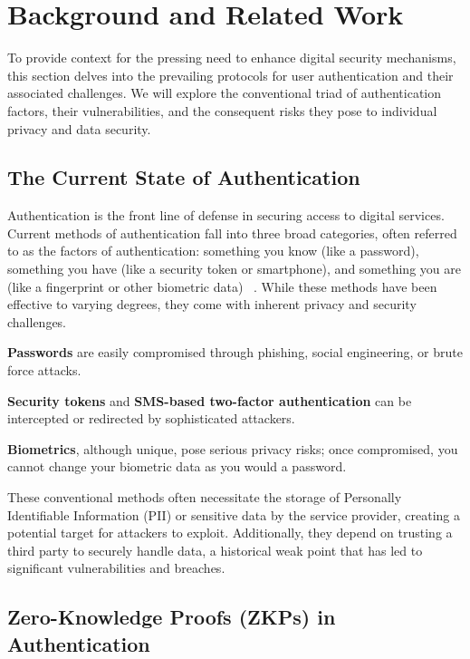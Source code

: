 \section{Background and Related Work}
\label{sec:relwork}

To provide context for the pressing need to enhance digital security mechanisms, this section delves into the prevailing protocols for user authentication and their associated challenges. We will explore the conventional triad of authentication factors, their vulnerabilities, and the consequent risks they pose to individual privacy and data security.

\subsection{The Current State of Authentication}
\label{subsec:auth}

Authentication is the front line of defense in securing access to digital services. Current methods of authentication fall into three broad categories, often referred to as the factors of authentication: something you know (like a password), something you have (like a security token or smartphone), and something you are (like a fingerprint or other biometric data) ~\cite{kizza2024auth}. While these methods have been effective to varying degrees, they come with inherent privacy and security challenges.

\begin{newitemize}
    \item \textbf{Passwords} are easily compromised through phishing, social engineering, or brute force attacks.
    \item \textbf{Security tokens} and \textbf{SMS-based two-factor authentication} can be intercepted or redirected by sophisticated attackers.
    \item \textbf{Biometrics}, although unique, pose serious privacy risks; once compromised, you cannot change your biometric data as you would a password.
\end{newitemize}

These conventional methods often necessitate the storage of Personally Identifiable Information (PII) or sensitive data by the service provider, creating a potential target for attackers to exploit. Additionally, they depend on trusting a third party to securely handle data, a historical weak point that has led to significant vulnerabilities and breaches. ~\cite{charles2022databreach}

\subsection{Zero-Knowledge Proofs (ZKPs) in Authentication}
\label{subsec:zkp}

